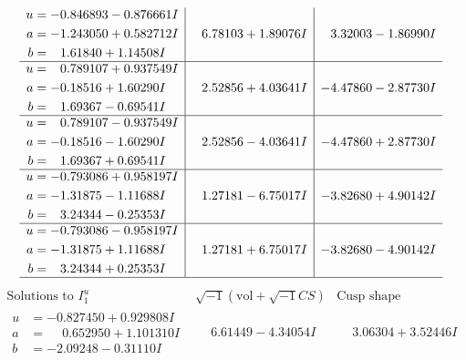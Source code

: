 \documentclass[1p]{elsarticle_modified}
\theoremstyle{definition}
\newcommand{\I}{\sqrt{-1}}
\begin{document}
$$\begin{array}{c|c|c}
\begin{aligned}
u &= -0.846893 - 0.876661 I \\
a &= -1.243050 + 0.582712 I \\
b &= \phantom{-}1.61840 + 1.14508 I\end{aligned}
 & \phantom{-}6.78103 + 1.89076 I & \phantom{-}3.32003 - 1.86990 I \\ \hline\begin{aligned}
u &= \phantom{-}0.789107 + 0.937549 I \\
a &= -0.18516 + 1.60290 I \\
b &= \phantom{-}1.69367 - 0.69541 I\end{aligned}
 & \phantom{-}2.52856 + 4.03641 I & -4.47860 - 2.87730 I \\ \hline\begin{aligned}
u &= \phantom{-}0.789107 - 0.937549 I \\
a &= -0.18516 - 1.60290 I \\
b &= \phantom{-}1.69367 + 0.69541 I\end{aligned}
 & \phantom{-}2.52856 - 4.03641 I & -4.47860 + 2.87730 I \\ \hline\begin{aligned}
u &= -0.793086 + 0.958197 I \\
a &= -1.31875 - 1.11688 I \\
b &= \phantom{-}3.24344 - 0.25353 I\end{aligned}
 & \phantom{-}1.27181 - 6.75017 I & -3.82680 + 4.90142 I \\ \hline\begin{aligned}
u &= -0.793086 - 0.958197 I \\
a &= -1.31875 + 1.11688 I \\
b &= \phantom{-}3.24344 + 0.25353 I\end{aligned}
 & \phantom{-}1.27181 + 6.75017 I & -3.82680 - 4.90142 I\\
 \hline 
 \end{array}$$\newpage$$\begin{array}{c|c|c}  
\text{Solutions to }I^u_{1}& \I (\text{vol} + \sqrt{-1}CS) & \text{Cusp shape}\\
 \hline 
\begin{aligned}
u &= -0.827450 + 0.929808 I \\
a &= \phantom{-}0.652950 + 1.101310 I \\
b &= -2.09248 - 0.31110 I\end{aligned}
 & \phantom{-}6.61449 - 4.34054 I & \phantom{-}3.06304 + 3.52446 I \\ \hline\begin{aligned}

\end{aligned}
\end{array}$$
\end{document}
